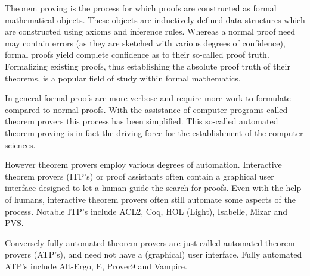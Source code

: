 Theorem proving is the process for which proofs are constructed as formal mathematical objects.
These objects are inductively defined data structures which are constructed using axioms and inference rules.
Whereas a normal proof need may contain errors (as they are sketched with various degrees of confidence),
formal proofs yield complete confidence as to their so-called proof truth.
Formalizing existing proofs, thus establishing the absolute proof truth of their theorems, is a popular field of study within formal mathematics.

In general formal proofs are more verbose and require more work to formulate compared to normal proofs.
With the assistance of computer programs called theorem provers this process has been simplified.
This so-called automated theorem proving is in fact the driving force for the establishment of the computer sciences.

However theorem provers employ various degrees of automation.
Interactive theorem provers (ITP's) or proof assistants often contain a graphical user interface designed to let a human guide the search for proofs.
Even with the help of humans, interactive theorem provers often still automate some aspects of the process.
Notable ITP's include ACL2, Coq, HOL (Light), Isabelle, Mizar and PVS.

Conversely fully automated theorem provers are just called automated theorem provers (ATP's), and need not have a (graphical) user interface.
Fully automated ATP's include Alt-Ergo, E, Prover9 and Vampire.

